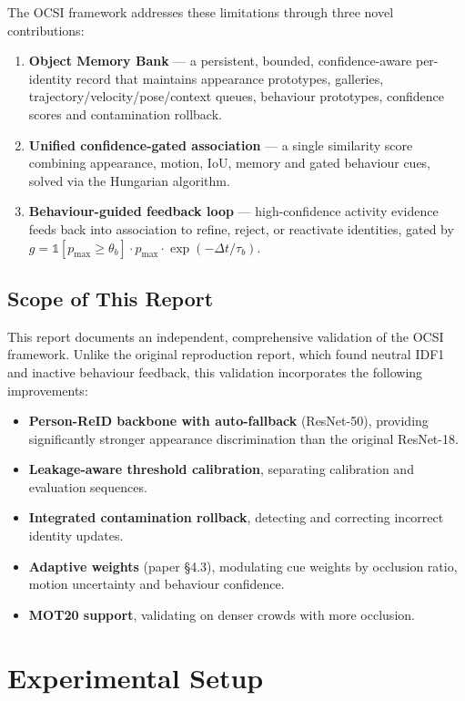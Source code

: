 \documentclass[11pt,a4paper]{article}
\begin{document}
The OCSI framework addresses these limitations through three novel contributions:
\begin{enumerate}[leftmargin=2em]
    \item \textbf{Object Memory Bank} --- a persistent, bounded, confidence-aware per-identity record that maintains appearance prototypes, galleries, trajectory/velocity/pose/context queues, behaviour prototypes, confidence scores and contamination rollback.
    \item \textbf{Unified confidence-gated association} --- a single similarity score combining appearance, motion, IoU, memory and gated behaviour cues, solved via the Hungarian algorithm.
    \item \textbf{Behaviour-guided feedback loop} --- high-confidence activity evidence feeds back into association to refine, reject, or reactivate identities, gated by $g = \mathbb{1}[p_{\max} \geq \theta_b] \cdot p_{\max} \cdot \exp(-\Delta t / \tau_b)$.
\end{enumerate}

\subsection{Scope of This Report}
This report documents an independent, comprehensive validation of the OCSI framework. Unlike the original reproduction report, which found neutral IDF1 and inactive behaviour feedback, this validation incorporates the following improvements:
\begin{itemize}[leftmargin=2em]
    \item \textbf{Person-ReID backbone with auto-fallback} (ResNet-50), providing significantly stronger appearance discrimination than the original ResNet-18.
    \item \textbf{Leakage-aware threshold calibration}, separating calibration and evaluation sequences.
    \item \textbf{Integrated contamination rollback}, detecting and correcting incorrect identity updates.
    \item \textbf{Adaptive weights} (paper \S4.3), modulating cue weights by occlusion ratio, motion uncertainty and behaviour confidence.
    \item \textbf{MOT20 support}, validating on denser crowds with more occlusion.
\end{itemize}

\section{Experimental Setup}
\end{document}
